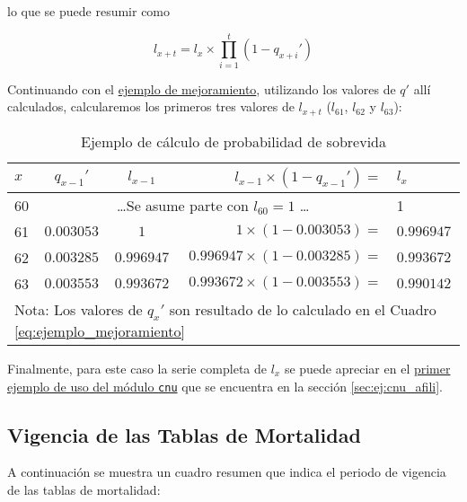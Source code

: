 \documentclass[letterpaper, 11pt]{article}
\begin{document}
\noindent lo que se puede resumir como

\begin{equation}
l_{x+t} = l_{x} \times \prod_{i=1}^{t}{(1 - q_{x + i}')}
\end{equation}


Continuando con el \hyperref[eq:ejemplo_mejoramiento]{ejemplo de mejoramiento},
utilizando los valores de $q'$ all\'i calculados, calcularemos los primeros tres
valores de $l_{x+t}$ ($l_{61}$, $l_{62}$ y $l_{63}$):

\begin{table}[H]
\centering
\caption{Ejemplo de c\'alculo de probabilidad de sobrevida\label{eq:ejemplo_sobrevida}}
\begin{tabular}{lccrl}
\toprule
$x$ & $q_{x-1}'$ & $l_{x-1}$ & $l_{x-1}\times(1 - q_{x-1}')=$ & $l_{x}$ \\
\midrule
60 & \multicolumn{3}{c}{\dots \footnotesize Se asume parte con $l_{60}= 1$ \dots} & 1 \\
61 & $0.003053$ & $1   $ & $1    \times (1 - 0.003053) =$ & $0.996947$ \\ 
62 & $0.003285$ & $0.996947$ & $0.996947 \times (1 - 0.003285) =$ & $0.993672$ \\ 
63 & $0.003553$ & $0.993672$ & $0.993672 \times (1 - 0.003553) =$ & $0.990142$ \\ 
\bottomrule
\multicolumn{5}{l}{\footnotesize Nota: Los valores de $q_x'$ son resultado de lo calculado en el Cuadro \ref{eq:ejemplo_mejoramiento}}
\end{tabular}
\end{table}

\noindent Finalmente, para este caso la serie completa de $l_x$ se puede
apreciar en el \hyperref[sec:ej:cnu_afili]{primer ejemplo de uso del m\'odulo {\tt cnu}}
que se encuentra en la secci\'on \ref{sec:ej:cnu_afili}.

\subsection{Vigencia de las Tablas de Mortalidad}

A continuaci\'on se muestra un cuadro resumen que indica el periodo de vigencia
de las tablas de mortalidad:

\def\colwid{.25\linewidth}
\end{document}
